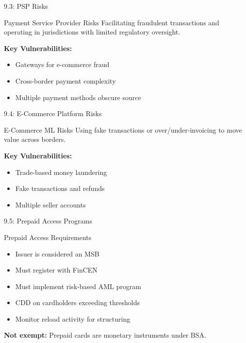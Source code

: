 \documentclass{beamer}
\begin{document}
	\begin{frame}{9.3: PSP Risks}
		\begin{block}{Payment Service Provider Risks}
			Facilitating fraudulent transactions and operating in jurisdictions with limited regulatory oversight.
		\end{block}
		\textbf{Key Vulnerabilities:}
		\begin{itemize}
			\item Gateways for e-commerce fraud
			\item Cross-border payment complexity
			\item Multiple payment methods obscure source
		\end{itemize}
	\end{frame}
	
	\begin{frame}{9.4: E-Commerce Platform Risks}
		\begin{block}{E-Commerce ML Risks}
			Using fake transactions or over/under-invoicing to move value across borders.
		\end{block}
		\textbf{Key Vulnerabilities:}
		\begin{itemize}
			\item Trade-based money laundering
			\item Fake transactions and refunds
			\item Multiple seller accounts
		\end{itemize}
	\end{frame}
	
	\begin{frame}{9.5: Prepaid Access Programs}
		\begin{block}{Prepaid Access Requirements}
			\begin{itemize}
				\item Issuer is considered an MSB
				\item Must register with FinCEN
				\item Must implement risk-based AML program
				\item CDD on cardholders exceeding thresholds
				\item Monitor reload activity for structuring
			\end{itemize}
		\end{block}
		\textbf{Not exempt:} Prepaid cards are monetary instruments under BSA.
	\end{frame}
	
\end{document}
